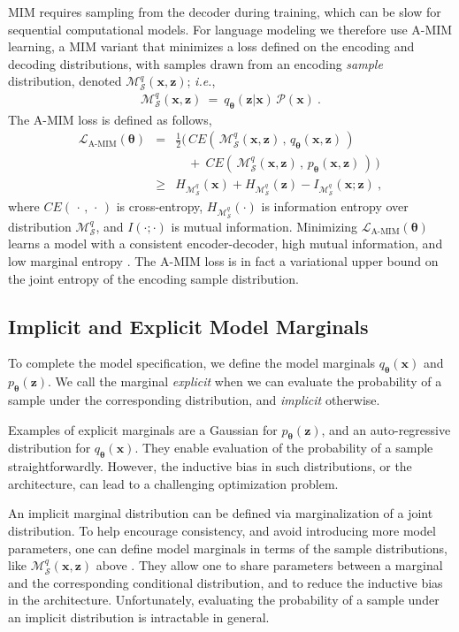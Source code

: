 \documentclass{article}
\newcommand{\bs}{\boldsymbol}
\newcommand{\ie}{{\em i.e.}}
\newcommand{\x}{{\bs{x}}}
\newcommand{\z}{{\bs z}}
\newcommand{\params}{{\bs \theta}}
\newcommand{\M}{\mathcal{M}}
\newcommand{\Msamp}{\M_{\mathcal{S}}}
\newcommand{\pjoint}{\mathcal{P}}
\newcommand{\pdec}{p}
\newcommand{\penc}{q}
\newcommand{\Mdec}{\pdec_{\params}}
\newcommand{\Menc}{\penc_{\params}}
\newcommand{\AMIMloss}{\mathcal{L}_\text{A-MIM}}
\newcommand{\CE}[2]{CE \left( \, #1 \,,\, #2 \, \right)}
\newcommand{\Penc}{\Menc(\z | \x)\, \pjoint(\x)}
\begin{document}
MIM requires sampling from the decoder during training, which can be slow for sequential computational models.
For language modeling we therefore use A-MIM learning, a MIM variant that minimizes a loss
defined on the encoding and decoding distributions, with samples drawn from an encoding 
{\em sample} distribution, denoted  $\Msamp^{\penc}(\x, \z)$;  \ie,
\begin{eqnarray}
    \Msamp^{\penc}(\x, \z) ~=~ \Penc \label{eq:sample-dist} ~.
\end{eqnarray}
The A-MIM loss is defined as follows,
\begin{eqnarray}
    \AMIMloss(\params) &=&
    \frac{1}{2} \big(\, \CE{\Msamp^{\penc}(\x, \z)}{\Menc \left(\x, \z \right)} \label{eq:A-MIM-asymmetric-bound} \\
    && \quad + ~ \CE{\Msamp^{\penc}(\x, \z)}{\Mdec \left(\x, \z \right)} \, \big) \nonumber \\
    &\geq& H_{\Msamp^{\penc}} (\x) + H_{\Msamp^{\penc}} (\z)  - I_{\Msamp^{\penc}} (\x;\z)~,
    \nonumber
\end{eqnarray}
where $\CE{\cdot}{\cdot}$ is cross-entropy, $H_{\Msamp^{\penc}}(\cdot)$ is information entropy over
distribution $\Msamp^{\penc}$, and $I(\cdot;\cdot)$ is mutual information.
Minimizing $\AMIMloss(\params)$ learns a model with a consistent
encoder-decoder, high mutual information, and low marginal entropy \citep{2019arXiv191003175L}.
The A-MIM loss is in fact a variational upper bound on the joint entropy of the encoding 
sample distribution.



\subsection{Implicit and Explicit Model Marginals} \label{sec:nlp-variational-priors}

To complete the model specification, we define the model marginals $\Menc(\x)$ and $\Mdec(\z)$.
We call the marginal {\it explicit}  when we can evaluate the probability of a sample 
under the corresponding distribution, and {\it implicit} otherwise.

Examples of explicit marginals are a Gaussian for $\Mdec(\z)$, and an auto-regressive distribution for $\Menc(\x)$. 
They enable evaluation of the probability of a sample straightforwardly. 
However, the inductive bias in such distributions, or the architecture, can lead to a  challenging optimization problem. 


An implicit marginal distribution can be defined via marginalization of a joint distribution.  
To help encourage consistency, and avoid introducing more model parameters, one can
define model marginals in terms of the sample distributions, like $\Msamp^{\penc}(\x, \z)$ above \citep{DBLP:journals/corr/BornscheinSFB15,2019arXiv191003175L,DBLP:journals/corr/TomczakW17}.
They allow one to share parameters between a marginal and the corresponding conditional distribution, 
and to reduce the inductive bias in the architecture. 
Unfortunately, evaluating the probability of a sample under an implicit distribution is intractable in general.
\end{document}
